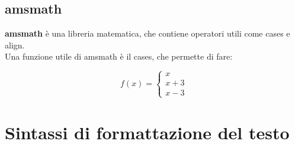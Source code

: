\documentclass[11pt]{article}
\begin{document}
\subsection{amsmath}
\textbf{amsmath} è una libreria matematica, che contiene operatori utili come cases e align.\\
Una funzione utile di amsmath è il cases, che permette di fare:

\[
      f(x)=\begin{cases}
                x\\
                x + 3\\
                x - 3
            \end{cases}
\]
\section{Sintassi di formattazione del testo}
\end{document}
